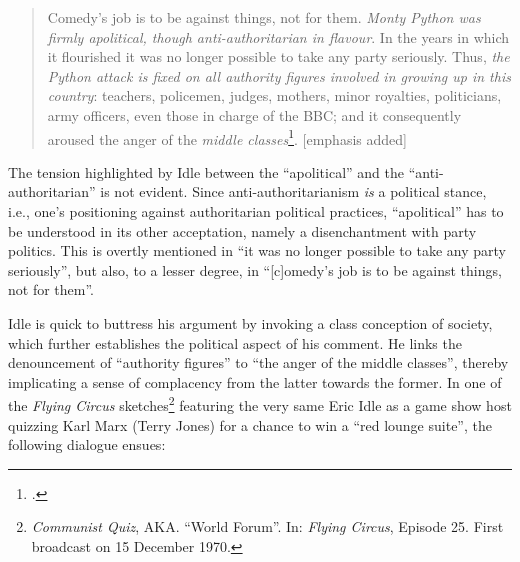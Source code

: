 \documentclass[
,a4paper
,DIV=12
,12pt
,abstract
,bibliography=totoc
]{scrartcl}
\begin{document}
\begin{quote}
  \label{quote-anti-authoritarian}
  Comedy’s job is to be against things, not for them.  \emph{Monty Python was firmly apolitical, though anti-authoritarian in flavour}.  In the years in which it flourished it was no longer possible to take any party seriously.  Thus, \emph{the Python attack is fixed on all authority figures involved in growing up in this country}: teachers, policemen, judges, mothers, minor royalties, politicians, army officers, even those in charge of the BBC; and it consequently aroused the anger of the \emph{middle classes}\footnote{\Cite[42]{clifford1989}.}. [emphasis added]
\end{quote}

The tension highlighted by Idle between the \enquote{apolitical} and the \enquote{anti-authoritarian} is not evident.  Since anti-authoritarianism \emph{is} a political stance, i.e., one’s positioning against authoritarian political practices, \enquote{apolitical} has to be understood in its other acceptation, namely a disenchantment with party politics\label{disenchantment}.  This is overtly mentioned in \enquote{it was no longer possible to take any party seriously}, but also, to a lesser degree, in \enquote{[c]omedy’s job is to be against things, not for them}.

Idle is quick to buttress his argument by invoking a class conception of society, which further establishes the political aspect of his comment.  He links the denouncement of \enquote{authority figures} to \enquote{the anger of the middle classes}, thereby implicating a sense of complacency from the latter towards the former.  In one of the \emph{Flying Circus} sketches\footnote{\emph{Communist Quiz}, AKA. \enquote{World Forum}.  In: \emph{Flying Circus}, Episode 25.  First broadcast on 15 December 1970.} featuring the very same Eric Idle as a game show host quizzing Karl Marx (Terry Jones) for a chance to win a \enquote{red lounge suite}, the following dialogue ensues:
\end{document}
